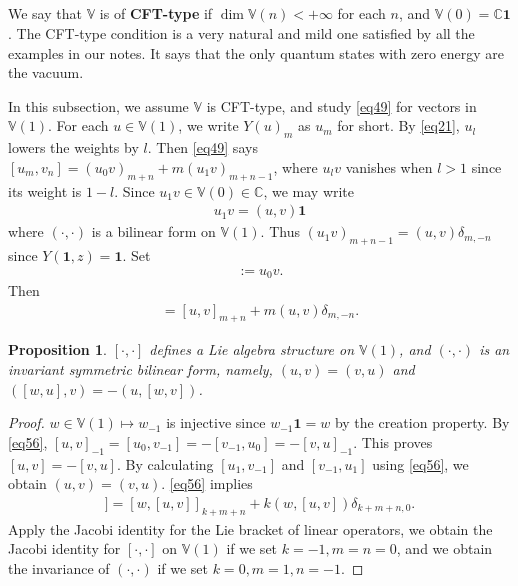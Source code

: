 \documentclass[11pt,b5paper,notitlepage]{article}
\theoremstyle{definition}
\theoremstyle{plain}
\newtheorem{pp}[df]{Proposition}
\newcommand{\id}{\mathbf{1}}
\newcommand{\prth}[1]{( {#1})}
\newcommand{\Vbb}{\mathbb V}
\newcommand{\Cbb}{\mathbb C}
\numberwithin{equation}{section}
\begin{document}
\subsection{}\label{lb56}
We say that $\Vbb$ is of \textbf{CFT-type} if $\dim\Vbb(n)<+\infty$ for each $n$, and $\Vbb(0)=\Cbb\id$. The CFT-type condition is a very natural and mild one satisfied by all the examples in our notes. It says that the only quantum states with zero energy are the vacuum.


In this subsection, we assume $\Vbb$ is CFT-type, and study \eqref{eq49} for vectors in $\Vbb(1)$. For each $u\in\Vbb(1)$, we write $Y(u)_m$ as $u_m$ for short. By \eqref{eq21}, $u_l$ lowers the weights by $l$. Then \eqref{eq49} says $[u_m,v_n]=(u_0v)_{m+n}+m(u_1v)_{m+n-1}$, where $u_lv$ vanishes when $l>1$ since its weight is $1-l$. Since $u_1v\in\Vbb(0)\in\Cbb$, we may write
\begin{align}
u_1v=\prth{u,v}\id	\label{eq58}
\end{align}
where $\prth{\cdot,\cdot}$ is a bilinear form on $\Vbb(1)$. Thus $(u_1v)_{m+n-1}=\prth{u,v}\delta_{m,-n}$ since $Y(\id,z)=\id$. Set
\begin{align}
[u,v]:=u_0v.	\label{eq55}
\end{align}
Then
\begin{align}
[u_m,v_n]=[u,v]_{m+n}+m\prth{u,v}\delta_{m,-n}.	\label{eq56}
\end{align}



\begin{pp}
$[\cdot,\cdot]$ defines a Lie algebra structure on $\Vbb(1)$, and $\prth{\cdot,\cdot}$ is an invariant symmetric bilinear form, namely, $\prth{u,v}=\prth{v,u}$ and $\prth{[w,u],v}=-\prth{u,[w,v]}$.
\end{pp}

\begin{proof}
$w\in\Vbb(1)\mapsto w_{-1}$ is injective since $w_{-1}\id=w$  by the creation property. By \eqref{eq56}, $[u,v]_{-1}=[u_0,v_{-1}]=-[v_{-1},u_0]=-[v,u]_{-1}$. This proves $[u,v]=-[v,u]$. By calculating $[u_1,v_{-1}]$ and $[v_{-1},u_1]$ using \eqref{eq56}, we obtain $\prth{u,v}=\prth{v,u}$. \eqref{eq56} implies 
\begin{align*}
[w_k,[u_m,v_n]]=[w,[u,v]]_{k+m+n}+k\prth{w,[u,v]}\delta_{k+m+n,0}.	
\end{align*}
Apply the Jacobi identity for the Lie bracket of linear operators, we obtain the Jacobi identity for $[\cdot,\cdot]$ on $\Vbb(1)$ if we set $k=-1,m=n=0$, and we obtain the invariance of $\prth{\cdot,\cdot}$ if we set $k=0,m=1,n=-1$.
\end{proof}
\end{document}

